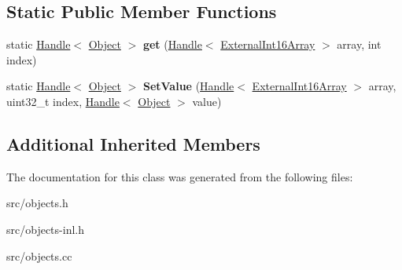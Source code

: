 \subsection*{Static Public Member Functions}
\begin{DoxyCompactItemize}
\item 
\hypertarget{classv8_1_1internal_1_1_external_int16_array_abefc4673177d57623f6d93048d93df2c}{}static \hyperlink{classv8_1_1internal_1_1_handle}{Handle}$<$ \hyperlink{classv8_1_1internal_1_1_object}{Object} $>$ {\bfseries get} (\hyperlink{classv8_1_1internal_1_1_handle}{Handle}$<$ \hyperlink{classv8_1_1internal_1_1_external_int16_array}{External\+Int16\+Array} $>$ array, int index)\label{classv8_1_1internal_1_1_external_int16_array_abefc4673177d57623f6d93048d93df2c}

\item 
\hypertarget{classv8_1_1internal_1_1_external_int16_array_a5992c0440839319977117c3dd95ac533}{}static \hyperlink{classv8_1_1internal_1_1_handle}{Handle}$<$ \hyperlink{classv8_1_1internal_1_1_object}{Object} $>$ {\bfseries Set\+Value} (\hyperlink{classv8_1_1internal_1_1_handle}{Handle}$<$ \hyperlink{classv8_1_1internal_1_1_external_int16_array}{External\+Int16\+Array} $>$ array, uint32\+\_\+t index, \hyperlink{classv8_1_1internal_1_1_handle}{Handle}$<$ \hyperlink{classv8_1_1internal_1_1_object}{Object} $>$ value)\label{classv8_1_1internal_1_1_external_int16_array_a5992c0440839319977117c3dd95ac533}

\end{DoxyCompactItemize}
\subsection*{Additional Inherited Members}


The documentation for this class was generated from the following files\+:\begin{DoxyCompactItemize}
\item 
src/objects.\+h\item 
src/objects-\/inl.\+h\item 
src/objects.\+cc\end{DoxyCompactItemize}
